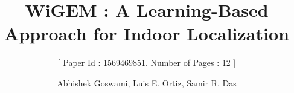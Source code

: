 \documentclass{sig-alternate-10pt}
\begin{document}
%

\title{WiGEM : A Learning-Based Approach for Indoor Localization}
\subtitle{[  Paper Id : 1569469851. Number of Pages : 12 ]}
%
%
%
%
%

%
\author{
%
%
\alignauthor
Abhishek Goswami, Luis E. Ortiz, Samir R. Das\\
       \\
       \\
}
\end{document}
